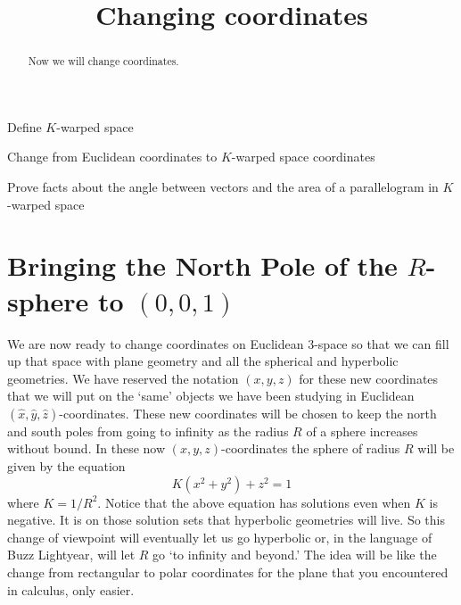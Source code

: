 \documentclass[newpage,hints,handout]{ximera}
\title{Changing coordinates}
\begin{document}
\begin{abstract}
Now we will change coordinates.
\end{abstract}
\maketitle

\begin{listOutcomes}
 \item Define $K$-warped space
 \item Change from Euclidean coordinates to $K$-warped space coordinates
 \item Prove facts about the angle between vectors and the area of a parallelogram in $K$-warped space
\end{listOutcomes}

\section{Bringing the North Pole of the $R$-sphere to $\left(
0,0,1\right)  $}

We are now ready to change coordinates on Euclidean $3$-space so that we can fill
up that space  with plane geometry and all the spherical and hyperbolic
geometries.  We have reserved the notation $(x,y,z)$ for these new coordinates
that we will put on the `same' objects we have been studying in Euclidean
$(\hat{x},\hat{y},\hat{z})$-coordinates. These new coordinates will be chosen to
keep the north and south poles from going to infinity as the radius $R$ of a
sphere increases without bound. In these now $(x,y,z)$-coordinates the sphere of
radius $R$ will be given by the equation
\[
K(x^{2}+y^{2})+z^{2}=1
\]
where $K=1/R^2$. Notice that the above equation has solutions even when $K$ is negative. It is on those solution sets that hyperbolic geometries will live. So this change of
viewpoint will eventually let us go hyperbolic or, in the language of Buzz
Lightyear, will let $R$ go `to infinity and beyond.' The
idea will be like the change from rectangular to polar coordinates for the
plane that you encountered in calculus, only easier. 
\end{document}
